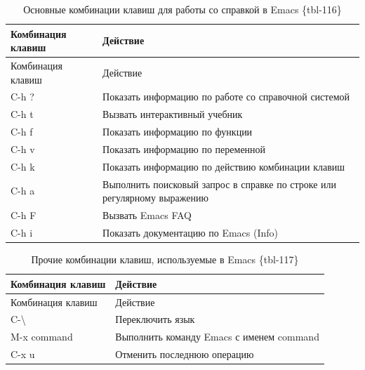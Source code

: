 \documentclass[
  english,
  russian,
  12pt,
  a4paper,
]{scrreprt}
\begin{document}
\begin{longtable}[]{@{}
  >{\raggedright\arraybackslash}p{}
  >{\raggedright\arraybackslash}p{}@{}}
\caption{Основные комбинации клавиш для работы со справкой в Emacs
\{tbl-116\}}\tabularnewline
\toprule\noalign{}
\begin{minipage}[b]{\linewidth}\raggedright
Комбинация клавиш
\end{minipage} & \begin{minipage}[b]{\linewidth}\raggedright
Действие
\end{minipage} \\
\midrule\noalign{}
\endfirsthead
\toprule\noalign{}
\begin{minipage}[b]{\linewidth}\raggedright
Комбинация клавиш
\end{minipage} & \begin{minipage}[b]{\linewidth}\raggedright
Действие
\end{minipage} \\
\midrule\noalign{}
\endhead
\bottomrule\noalign{}
\endlastfoot
C-h ? & Показать информацию по работе со справочной системой \\
C-h t & Вызвать интерактивный учебник \\
C-h f & Показать информацию по функции \\
C-h v & Показать информацию по переменной \\
C-h k & Показать информацию по действию комбинации клавиш \\
C-h a & Выполнить поисковый запрос в справке по строке или регулярному
выражению \\
C-h F & Вызвать Emacs FAQ \\
C-h i & Показать документацию по Emacs (Info) \\
\end{longtable}

\begin{longtable}[]{@{}ll@{}}
\caption{Прочие комбинации клавиш, используемые в Emacs
\{tbl-117\}}\tabularnewline
\toprule\noalign{}
Комбинация клавиш & Действие \\
\midrule\noalign{}
\endfirsthead
\toprule\noalign{}
Комбинация клавиш & Действие \\
\midrule\noalign{}
\endhead
\bottomrule\noalign{}
\endlastfoot
C-\textbackslash{} & Переключить язык \\
M-x command & Выполнить команду Emacs с именем command \\
C-x u & Отменить последнюю операцию \\
\end{longtable}
\end{document}
